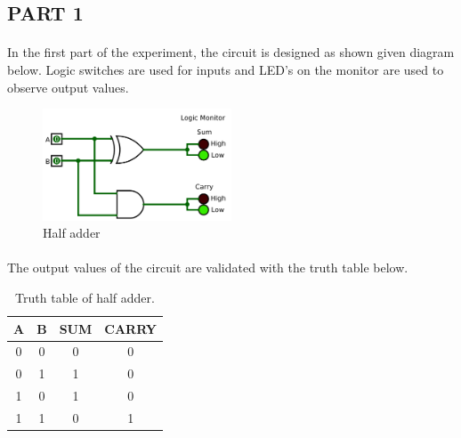 \documentclass[pdftex,12pt,a4paper]{article}
\begin{document}
\begin{flushleft}

\subsection{PART 1}
    \paragraph{}
    In the first part of the experiment, the circuit is designed as shown given diagram below. Logic switches are used for inputs and LED's on the monitor are used to observe output values.
    
      \begin{figure}[h]
    	\centering
    	\includegraphics[width=0.5\textwidth]{part1.png}	
    	\caption{Half adder}
    	\label{fig:half_adder}
    \end{figure}
    \newpage
    \paragraph{}
    The output values of the circuit are validated with the truth table below.
    
    \begin{table}[!h]
    
\begin{center}
    \begin{tabular}{|c|c|c|c|}
    \hline
    
        \hline
         A & B & SUM & CARRY \\
         \hline
         0 & 0 & 0 & 0 \\
         \hline
         0 & 1 & 1 & 0 \\
         \hline
         1 & 0 & 1 & 0 \\
         \hline
         1 & 1 & 0 & 1 \\
         \hline
    \end{tabular}
    \caption{Truth table of half adder.}
    \label{table_half}
\end{center}
\end{table}

\end{flushleft}
\end{document}

